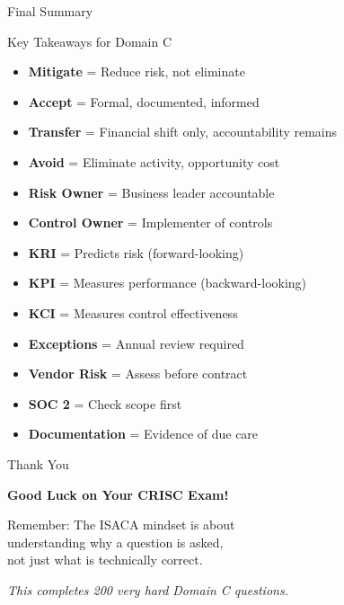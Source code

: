 \documentclass{beamer}
\begin{document}
	\begin{frame}{Final Summary}
		\begin{block}{Key Takeaways for Domain C}
			\begin{itemize}
				\item \textbf{Mitigate} = Reduce risk, not eliminate
				\item \textbf{Accept} = Formal, documented, informed
				\item \textbf{Transfer} = Financial shift only, accountability remains
				\item \textbf{Avoid} = Eliminate activity, opportunity cost
				\item \textbf{Risk Owner} = Business leader accountable
				\item \textbf{Control Owner} = Implementer of controls
				\item \textbf{KRI} = Predicts risk (forward-looking)
				\item \textbf{KPI} = Measures performance (backward-looking)
				\item \textbf{KCI} = Measures control effectiveness
				\item \textbf{Exceptions} = Annual review required
				\item \textbf{Vendor Risk} = Assess before contract
				\item \textbf{SOC 2} = Check scope first
				\item \textbf{Documentation} = Evidence of due care
			\end{itemize}
		\end{block}
	\end{frame}
	
	\begin{frame}{Thank You}
		\begin{center}
			\Huge
			\textbf{Good Luck on Your CRISC Exam!}
			
			\vspace{1cm}
			
			\normalsize
			Remember: The ISACA mindset is about\\
			understanding why a question is asked,\\
			not just what is technically correct.
			
			\vspace{1cm}
			
			\textit{This completes 200 very hard Domain C questions.}
		\end{center}
	\end{frame}
	
\end{document}
